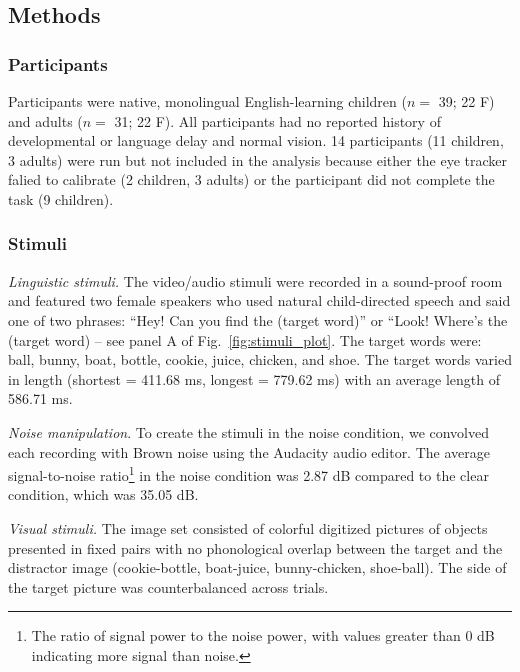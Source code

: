 \documentclass[english,floatsintext,man]{apa6}
\theoremstyle{definition}
\theoremstyle{definition}
\theoremstyle{definition}
\theoremstyle{remark}
\begin{document}
\hypertarget{methods-2}{%
\subsection{Methods}\label{methods-2}}

\hypertarget{participants-2}{%
\subsubsection{Participants}\label{participants-2}}

Participants were native, monolingual English-learning children (\(n=\)
39; 22 F) and adults (\(n=\) 31; 22 F). All participants had no reported
history of developmental or language delay and normal vision. 14
participants (11 children, 3 adults) were run but not included in the
analysis because either the eye tracker falied to calibrate (2 children,
3 adults) or the participant did not complete the task (9 children).

\hypertarget{stimuli-2}{%
\subsubsection{Stimuli}\label{stimuli-2}}

\emph{Linguistic stimuli.} The video/audio stimuli were recorded in a
sound-proof room and featured two female speakers who used natural
child-directed speech and said one of two phrases: \enquote{Hey! Can you
find the (target word)} or ``Look! Where's the (target word) -- see
panel A of Fig.~\ref{fig:stimuli_plot}. The target words were: ball,
bunny, boat, bottle, cookie, juice, chicken, and shoe. The target words
varied in length (shortest = 411.68 ms, longest = 779.62 ms) with an
average length of 586.71 ms.

\emph{Noise manipulation}. To create the stimuli in the noise condition,
we convolved each recording with Brown noise using the Audacity audio
editor. The average signal-to-noise ratio\footnote{The ratio of signal
  power to the noise power, with values greater than 0 dB indicating
  more signal than noise.} in the noise condition was 2.87 dB compared
to the clear condition, which was 35.05 dB.

\emph{Visual stimuli.} The image set consisted of colorful digitized
pictures of objects presented in fixed pairs with no phonological
overlap between the target and the distractor image (cookie-bottle,
boat-juice, bunny-chicken, shoe-ball). The side of the target picture
was counterbalanced across trials.
\end{document}

